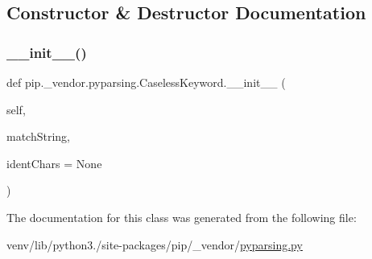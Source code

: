 \subsection{Constructor \& Destructor Documentation}
\mbox{\label{classpip_1_1__vendor_1_1pyparsing_1_1CaselessKeyword_a44094727a36527cc493647a06f2d3c61}} 
\subsubsection{\texorpdfstring{\+\_\+\+\_\+init\+\_\+\+\_\+()}{\_\_init\_\_()}}
{\footnotesize\ttfamily def pip.\+\_\+vendor.\+pyparsing.\+Caseless\+Keyword.\+\_\+\+\_\+init\+\_\+\+\_\+ (\begin{DoxyParamCaption}\item[{}]{self,  }\item[{}]{match\+String,  }\item[{}]{ident\+Chars = {\ttfamily None} }\end{DoxyParamCaption})}



The documentation for this class was generated from the following file\+:\begin{DoxyCompactItemize}
\item 
venv/lib/python3./site-\/packages/pip/\+\_\+vendor/\hyperlink{pip_2__vendor_2pyparsing_8py}{pyparsing.\+py}\end{DoxyCompactItemize}
